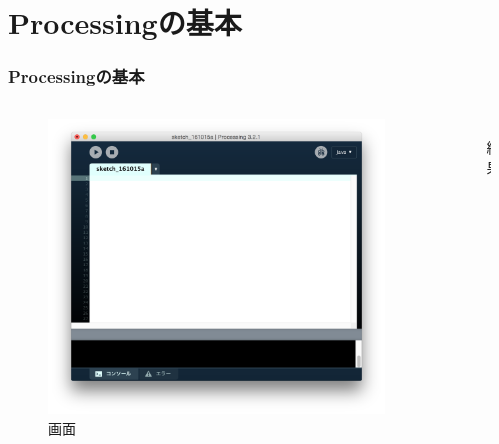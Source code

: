 \documentclass[dvipdfmx]{beamer}
\begin{document}
    \section{Processingの基本}
        \begin{frame}
            \frametitle{Processingの基本}
            \tiny
            \begin{columns}[c]
                \begin{column}{0.35\textwidth}
                    \begin{figure}[htb]
                        \includegraphics[width=\columnwidth]{images/01.png}
                        \caption{画面}
                        \label{fig:01}
                    \end{figure}
                \end{column}
                \begin{column}{0.20\textwidth}
                    \begin{figure}[htb]
                        \includegraphics[width=10mm]{images/02.png}
                        \caption{結果}
                        \label{02}
                    \end{figure}
                \end{column}
                \begin{column}{0.45\textwidth}

\end{column}
\end{columns}
\end{frame}
\end{document}
